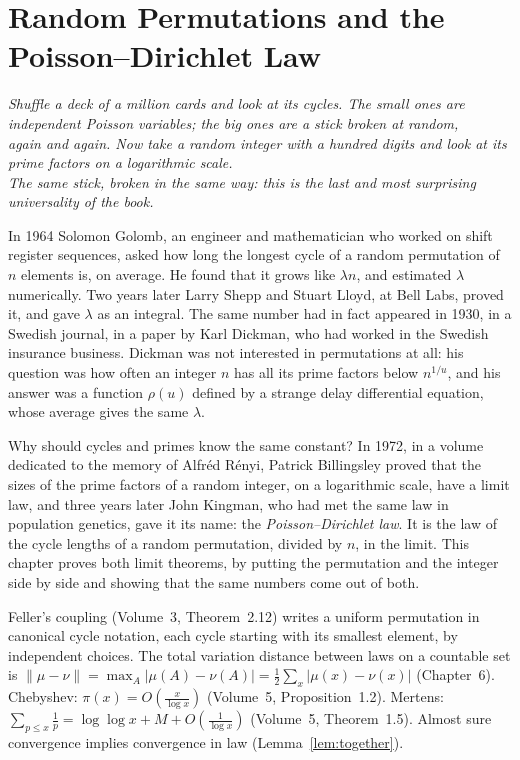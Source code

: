 \chapter{Random Permutations and the Poisson--Dirichlet Law}
\begin{center}\itshape
Shuffle a deck of a million cards and look at its cycles. The small ones are independent Poisson variables; the big ones are a stick broken at random,\\
again and again. Now take a random integer with a hundred digits and look at its prime factors on a logarithmic scale.\\
The same stick, broken in the same way: this is the last and most surprising universality of the book.
\end{center}

In 1964 Solomon Golomb, an engineer and mathematician who worked on shift register sequences, asked how long the longest cycle of a random permutation of $n$ elements is, on average. He found that it grows like
$\lambda n$, and estimated $\lambda$ numerically. Two years later Larry Shepp and Stuart Lloyd, at Bell Labs, proved it, and gave $\lambda$ as an integral. The same number had in fact appeared in 1930, in a Swedish journal, in a paper by Karl
Dickman, who had worked in the Swedish insurance business. Dickman was not interested in permutations at all: his question was how often an integer $n$ has all its prime factors below $n^{1/u}$, and his answer was a function $\rho(u)$ defined by
a strange delay differential equation, whose average gives the same $\lambda$.

Why should cycles and primes know the same constant? In 1972, in a volume dedicated to the memory of Alfr\'ed R\'enyi, Patrick Billingsley proved that the sizes of the prime factors of a random integer, on a logarithmic scale, have a limit law, and three years later
John Kingman, who had met the same law in population genetics, gave it its name: the \emph{Poisson--Dirichlet law}. It is the law of the cycle lengths of a random permutation, divided by $n$, in the limit. This chapter proves both limit theorems, by putting
the permutation and the integer side by side and showing that the same numbers come out of both.

\begin{reminder}
Feller's coupling (Volume~3, Theorem~2.12) writes a uniform permutation in canonical cycle notation, each cycle starting with its smallest element, by independent choices. The total variation distance between laws on a countable set is
$\|\mu-\nu\|=\max_A|\mu(A)-\nu(A)|=\frac12\sum_x|\mu(x)-\nu(x)|$ (Chapter~6). Chebyshev: $\pi(x)=O(\frac x{\log x})$ (Volume~5, Proposition~1.2). Mertens: $\sum_{p\le x}\frac1p=\log\log x+M+O(\frac1{\log x})$ (Volume~5, Theorem~1.5).
Almost sure convergence implies convergence in law (Lemma~\ref{lem:together}).
\end{reminder}

